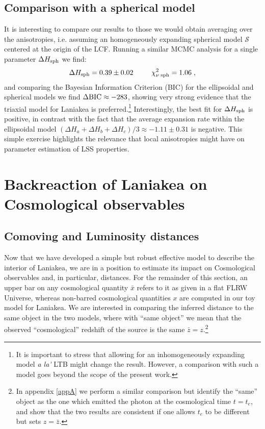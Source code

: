 \documentclass[notitlepage,nofootinbib]{revtex4-1}
\begin{document}
\subsection{Comparison with a spherical model}
 It is interesting to compare our results to those we would obtain averaging over the anisotropies, i.e. assuming an homogeneously expanding spherical model $\mathcal{S}$ centered at the origin of the LCF. Running a similar MCMC analysis for a single parameter $\Delta H_{\rm{sph}}$ we find:
 \begin{equation}
     \Delta H_{\rm{sph}} = 0.39 \pm 0.02 \;\;\qquad  \chi^2_{\nu\;\rm{sph}}= 1.06\;,
 \end{equation}
and comparing the Bayesian Information Criterion (BIC) for the ellipsoidal and spherical models we find $\Delta\rm{BIC}\approx -283$, showing very strong evidence that the triaxial model for Laniakea is preferred.\footnote{It is important to stress that allowing for an inhomogeneously expanding model \textit{a la\'} LTB might change the result. However, a comparison with such a model goes beyond the scope of the present work.}  
Interestingly, the best fit for $\Delta H_{\rm{sph}}$ is positive, in contrast with the fact that the average expansion rate within the ellipsoidal model $\left(\Delta H_a + \Delta H_b +\Delta H_c\right)/3\approx -1.11 \pm 0.31$ is negative. This simple exercise highlights the relevance that local anisotropies might have on parameter estimation of LSS properties. 




\section{Backreaction of Laniakea on Cosmological observables}

\label{Backreaction_cosmo}

\subsection{Comoving and Luminosity distances}

\label{distances_comparison}
Now that we have developed a simple but robust effective model to describe the interior of Laniakea, we are in a position to estimate its impact on Cosmological observables and, in particular, distances. For the remainder of this section, an upper bar on any cosmological quantity $\bar{x}$ refers to it as given in a flat FLRW Universe, whereas non-barred cosmological quantities $x$ are computed in our toy model for Laniakea. We are interested in comparing the inferred distance to the same object in the two models, where with ``same object'' we mean that the observed ``cosmological'' redshift of the source is the same $\bar{z}=z$.\footnote{In appendix \ref{appA} we perform a similar comparison but identify the ``same'' object as the one which emitted the photon at the cosmological time $t=t_e$, and show that the two results are consistent if one allows $t_e$ to be different but sets $z=\bar{z}$.}   
\end{document}
